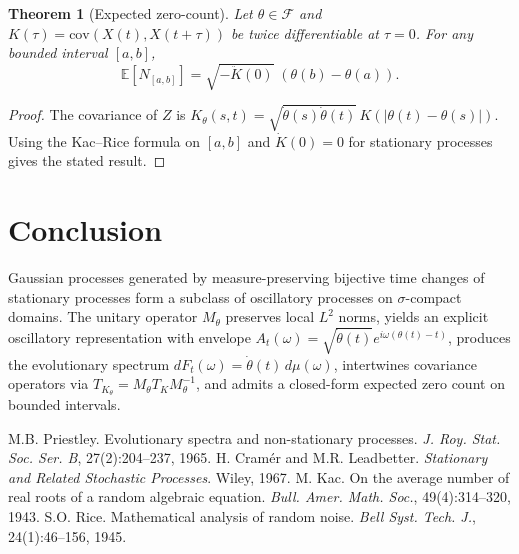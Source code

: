 \documentclass{article}
\newtheorem{theorem}{Theorem}[section]
\begin{document}
\begin{theorem}[Expected zero-count]\label{thm:zero_count}
Let $\theta\in\mathcal{F}$ and $K(\tau)=\mathrm{cov}(X(t),X(t+\tau))$ be twice differentiable at $\tau=0$. For any bounded interval $[a,b]$,
\[
\mathbb{E}[N_{[a,b]}]=\sqrt{-\ddot{K}(0)}\; (\theta(b)-\theta(a)).
\]
\end{theorem}

\begin{proof}
The covariance of $Z$ is $K_\theta(s,t)=\sqrt{\dot{\theta}(s)\dot{\theta}(t)}\, K(|\theta(t)-\theta(s)|)$. Using the Kac–Rice formula on $[a,b]$ and $\dot{K}(0)=0$ for stationary processes gives the stated result.
\end{proof}

\section{Conclusion}
Gaussian processes generated by measure-preserving bijective time changes of stationary processes form a subclass of oscillatory processes on $\sigma$-compact domains. The unitary operator $M_\theta$ preserves local $L^2$ norms, yields an explicit oscillatory representation with envelope $A_t(\omega)=\sqrt{\dot{\theta}(t)} e^{i\omega(\theta(t)-t)}$, produces the evolutionary spectrum $dF_t(\omega)=\dot{\theta}(t)\, d\mu(\omega)$, intertwines covariance operators via $T_{K_\theta}=M_\theta T_K M_\theta^{-1}$, and admits a closed-form expected zero count on bounded intervals.

\begin{thebibliography}{99}
 M.B. Priestley. Evolutionary spectra and non-stationary processes. \emph{J. Roy. Stat. Soc. Ser. B}, 27(2):204--237, 1965.
 H. Cramér and M.R. Leadbetter. \emph{Stationary and Related Stochastic Processes}. Wiley, 1967.
 M. Kac. On the average number of real roots of a random algebraic equation. \emph{Bull. Amer. Math. Soc.}, 49(4):314--320, 1943.
 S.O. Rice. Mathematical analysis of random noise. \emph{Bell Syst. Tech. J.}, 24(1):46--156, 1945.
\end{thebibliography}
\end{document}
